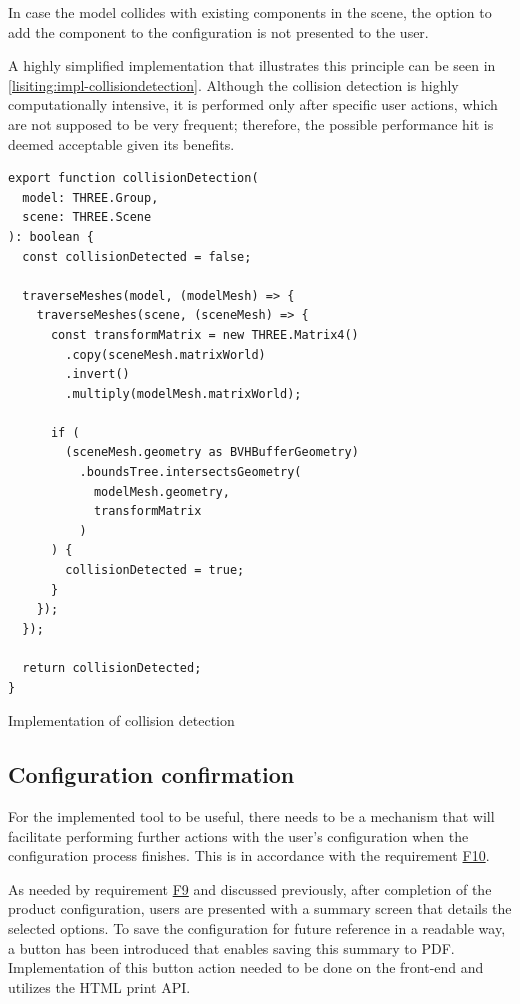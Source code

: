 In case the model collides with existing components in the scene, the option to add the component to the configuration is not presented to the user.

A highly simplified implementation that illustrates this principle can be seen in \autoref{lisiting:impl-collisiondetection}. Although the collision detection is highly computationally intensive, it is performed only after specific user actions, which are not supposed to be very frequent; therefore, the possible performance hit is deemed acceptable given its benefits.

\begin{listing}[h!]
\begin{verbatim}
export function collisionDetection(
  model: THREE.Group,
  scene: THREE.Scene
): boolean {
  const collisionDetected = false;

  traverseMeshes(model, (modelMesh) => {
    traverseMeshes(scene, (sceneMesh) => {
      const transformMatrix = new THREE.Matrix4()
        .copy(sceneMesh.matrixWorld)
        .invert()
        .multiply(modelMesh.matrixWorld);

      if (
        (sceneMesh.geometry as BVHBufferGeometry)
          .boundsTree.intersectsGeometry(
            modelMesh.geometry,
            transformMatrix
          )
      ) {
        collisionDetected = true;
      }
    });
  });

  return collisionDetected;
}
\end{verbatim}
\caption{Implementation of collision detection}
\label{lisiting:impl-collisiondetection}
\end{listing}

\subsection{Configuration confirmation}

For the implemented tool to be useful, there needs to be a mechanism that will facilitate performing further actions with the user's configuration when the configuration process finishes. This is in accordance with the requirement \hyperref[itm:F10]{F10}.

As needed by requirement \hyperref[itm:F9]{F9} and discussed previously, after completion of the product configuration, users are presented with a summary screen that details the selected options. To save the configuration for future reference in a readable way, a button has been introduced that enables saving this summary to PDF. Implementation of this button action needed to be done on the front-end and utilizes the HTML print API.

